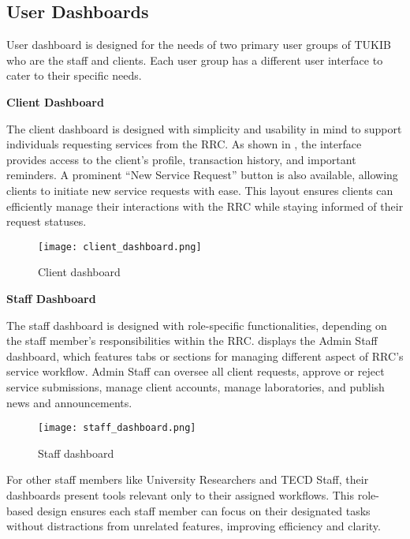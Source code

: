\subsection{User Dashboards}

User dashboard is designed for the needs of two primary user groups of TUKIB who are the staff and clients. Each user group has a different user interface to cater to their specific needs.

\textbf{Client Dashboard}

The client dashboard is designed with simplicity and usability in mind to support individuals requesting services from the RRC. As shown in , the interface provides access to the client's profile, transaction history, and important reminders. A prominent “New Service Request” button is also available, allowing clients to initiate new service requests with ease. This layout ensures clients can efficiently manage their interactions with the RRC while staying informed of their request statuses.

\begin{figure}[h]
	\centering 
	\texttt{[image: client\_dashboard.png]}
	\caption{Client dashboard}
	\label{fig:client_dashboard}
\end{figure}

\newpage

\textbf{Staff Dashboard}

The staff dashboard is designed with role-specific functionalities, depending on the staff member's responsibilities within the RRC.  displays the Admin Staff dashboard, which features tabs or sections for managing different aspect of RRC's service workflow. Admin Staff can oversee all client requests, approve or reject service submissions, manage client accounts, manage laboratories, and publish news and announcements.

\begin{figure}[h]
	\centering 
	\texttt{[image: staff\_dashboard.png]}
	\caption{Staff dashboard}
	\label{fig:staff_dashboard}
\end{figure}

For other staff members like University Researchers and TECD Staff, their dashboards present tools relevant only to their assigned workflows. This role-based design ensures each staff member can focus on their designated tasks without distractions from unrelated features, improving efficiency and clarity.

